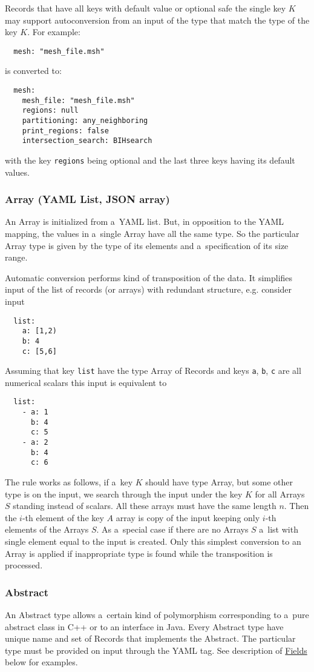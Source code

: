 Records that have all keys with default value or optional safe the single key $K$ may support autoconversion from an input of the type that match 
the type of the key $K$. For example:
\begin{verbatim}
  mesh: "mesh_file.msh"
\end{verbatim}
is converted to:
\begin{verbatim}
  mesh:
    mesh_file: "mesh_file.msh"
    regions: null
    partitioning: any_neighboring
    print_regions: false
    intersection_search: BIHsearch
\end{verbatim}
with the key \verb'regions' being optional and the last three keys having its default values. 


\subsubsection{Array (YAML List, JSON array)}
An Array is initialized from a~YAML list. But, in opposition to the YAML mapping, the values in a~single Array 
have all the same type. So the particular Array type is given by the type of its elements and a~specification of its size range.

Automatic conversion performs kind of transposition of the data. It simplifies input of the list of records (or arrays) 
with redundant structure, e.g. consider input
\begin{verbatim}
  list:
    a: [1,2)
    b: 4
    c: [5,6]
\end{verbatim}
Assuming that key \verb'list' have the type Array of Records and keys \verb'a', \verb'b', \verb'c' are all numerical scalars this input is equivalent to
\begin{verbatim}
  list:
    - a: 1
      b: 4
      c: 5
    - a: 2
      b: 4
      c: 6
\end{verbatim}
The rule works as follows, if a~key $K$ should have type Array, but some other type is on the input, 
we search through the input under the key $K$ for all Arrays $S$ standing instead of scalars.
All these arrays must have the same length $n$. Then the $i$-th element of the key $A$ array is
copy of the input keeping only $i$-th elements of the Arrays $S$.
As a~special case if there are no Arrays $S$ a~list with single element equal to the input is created.
Only this simplest conversion to an Array is applied if inappropriate type is found 
while the transposition is processed.





\subsubsection{Abstract}
\label{sec:abstract}
An Abstract type allows a~certain kind of polymorphism corresponding to a~pure abstract class in C++ or to an interface in Java. 
Every Abstract type have unique name and set of Records that implements the Abstract. The particular type must be provided on input through the YAML tag.
See description of \hyperlink{sec:Fields}{Fields} below for examples.

